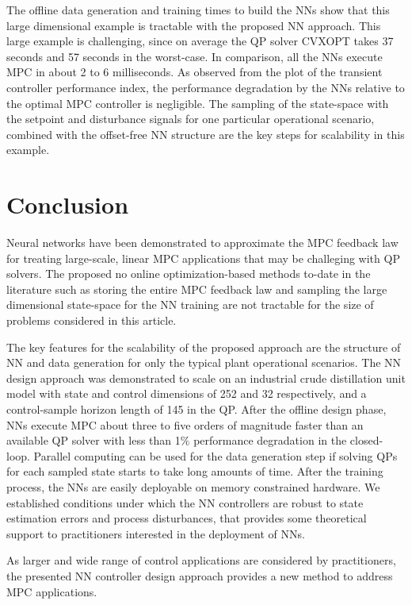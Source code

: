 \documentclass[preprint,5p, twocolumn, authoryear]{elsarticle}
\begin{document}
The offline data generation and training times 
to build the NNs show that this large dimensional example
is tractable with the proposed NN approach.
This large example is challenging, 
since on average the QP solver CVXOPT takes 37 seconds
and 57 seconds in the worst-case. In comparison,  
all the NNs execute MPC in about 2 to 6 milliseconds.
As observed from the plot of the transient controller 
performance index, the performance 
degradation by the NNs relative to 
the optimal MPC controller is negligible.
The sampling of the state-space with 
the setpoint and disturbance signals
for one particular operational scenario,
combined with the offset-free NN structure
are the key steps for scalability in this example. 

\section{Conclusion} \label{sec:conclusion}
Neural networks have been demonstrated 
to approximate the MPC feedback law
for treating large-scale, linear MPC applications
that may be challeging with QP solvers. 
The proposed no online optimization-based
methods to-date in the literature such as storing 
the entire MPC feedback law 
and sampling the large dimensional state-space 
for the NN training are not tractable for the size of problems 
considered in this article.

The key features for the scalability of the proposed approach 
are the structure of NN and data generation for only the
typical plant operational scenarios. 
The NN design approach was demonstrated to scale on an
industrial crude distillation unit model with state and
control dimensions of 252 and 32 respectively, and 
a control-sample horizon length of 145 in the QP. 
After the offline design phase, NNs execute MPC 
about three to five orders of magnitude faster than an 
available QP solver 
with less than 1$\%$ performance degradation in the closed-loop. 
Parallel computing can be used for the data generation step
if solving QPs for each sampled state starts to take long 
amounts of time.
After the training process, 
the NNs are easily deployable on memory constrained hardware.
We established conditions under which the 
NN controllers are robust to state estimation errors 
and process disturbances,
that provides some theoretical support 
to practitioners interested in the deployment of NNs. 

As larger and wide range of
control applications are considered by practitioners, 
the presented NN controller design approach 
provides a new method to address MPC applications.
\end{document}
